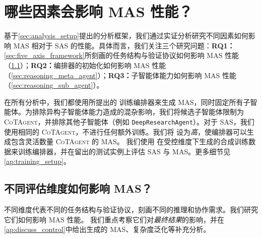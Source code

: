 

\section{哪些因素会影响 MAS 性能？}
\label{sec:analysis}

基于\cref{sec:analysis_setup}提出的分析框架，我们通过实证分析研究不同因素如何影响 MAS 相对于 SAS 的性能。具体而言，我们关注三个研究问题：\textbf{RQ1：} \cref{sec:five_axis_framework}所刻画的任务结构与验证协议如何影响 MAS 性能（\cref{sec:subtask_structure}）；\textbf{RQ2：}编排器的初始化如何影响 MAS 性能（\cref{sec:reasoning_meta_agent}）；\textbf{RQ3：}子智能体能力如何影响 MAS 性能（\cref{sec:reasoning_sub_agent}）。

在所有分析中，我们都使用所提出的 \ourframework 训练编排器来生成 MAS，同时固定所有子智能体。为排除异构子智能体能力造成的混杂影响，我们将候选子智能体限制为 \textsc{CoTAgent}，并排除其他子智能体（例如 \texttt{DeepResearchAgent}）。对于 SAS，我们使用相同的 \textsc{CoTAgent}，不进行任何额外训练。我们将 \masness 设为\textit{高}，使编排器可以生成包含灵活数量 \textsc{CoTAgent} 的 MAS。
我们使用 \ourbenchmark 在受控维度下生成的合成训练数据来训练编排器，并在留出的测试实例上评估 SAS 与 MAS。更多细节见\cref{ap:training_setup}。

\subsection{不同评估维度如何影响 MAS？}
\label{sec:subtask_structure}
不同维度代表不同的任务结构与验证协议，刻画不同的推理和协作需求。我们研究它们如何影响 MAS 性能。
{
我们重点考察它们对\textit{最终结果}的影响，并在\cref{ap:discuss_control}中给出生成的 MAS、复杂度泛化等补充分析。}

